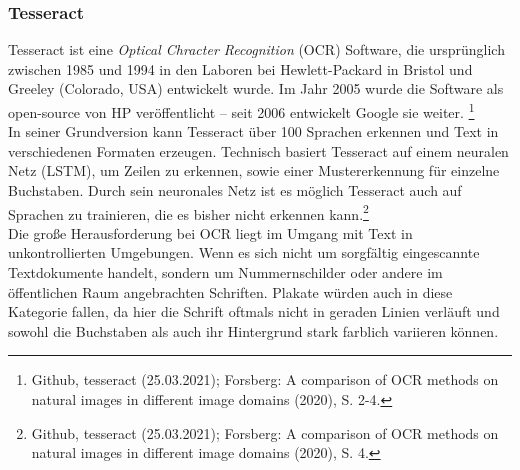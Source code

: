 \documentclass[a4paper,12pt,ngerman]{article}
\begin{document}
\subsubsection{Tesseract}
Tesseract ist eine \textit{Optical Chracter Recognition} (OCR) Software, die ursprünglich zwischen 1985 und 1994 in den Laboren bei Hewlett-Packard in Bristol und Greeley (Colorado, USA) entwickelt wurde. Im Jahr 2005 wurde die Software als open-source von HP veröffentlicht – seit 2006 entwickelt Google sie weiter. \footnote{Github, tesseract (25.03.2021); Forsberg: A comparison of OCR methods on natural images in different image domains (2020), S. 2-4.} \\
In seiner Grundversion kann Tesseract über 100 Sprachen erkennen und Text in verschiedenen Formaten erzeugen. Technisch basiert Tesseract auf einem neuralen Netz (LSTM), um Zeilen zu erkennen, sowie einer Mustererkennung für einzelne Buchstaben. Durch sein neuronales Netz ist es möglich Tesseract auch auf Sprachen zu trainieren, die es bisher nicht erkennen kann.\footnote{Github, tesseract (25.03.2021); Forsberg: A comparison of OCR methods on natural images in different image domains (2020), S. 4. } \\
Die große Herausforderung bei OCR liegt im Umgang mit Text in unkontrollierten Umgebungen. Wenn es sich nicht um sorgfältig eingescannte Textdokumente handelt, sondern um Nummernschilder oder andere im öffentlichen Raum angebrachten Schriften. Plakate würden auch in diese Kategorie fallen, da hier die Schrift oftmals nicht in geraden Linien verläuft und sowohl die Buchstaben als auch ihr Hintergrund stark farblich variieren können.
\end{document}
